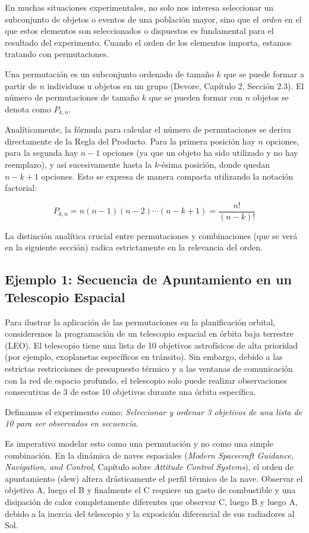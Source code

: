 En muchas situaciones experimentales, no solo nos interesa seleccionar un subconjunto de objetos o eventos de una población mayor, sino que el \textit{orden} en el que estos elementos son seleccionados o dispuestos es fundamental para el resultado del experimento. Cuando el orden de los elementos importa, estamos tratando con permutaciones. 

Una permutación es un subconjunto ordenado de tamaño $k$ que se puede formar a partir de $n$ individuos u objetos en un grupo (Devore, Capítulo 2, Sección 2.3). El número de permutaciones de tamaño $k$ que se pueden formar con $n$ objetos se denota como $P_{k,n}$. 

Analíticamente, la fórmula para calcular el número de permutaciones se deriva directamente de la Regla del Producto. Para la primera posición hay $n$ opciones, para la segunda hay $n-1$ opciones (ya que un objeto ha sido utilizado y no hay reemplazo), y así sucesivamente hasta la $k$-ésima posición, donde quedan $n-k+1$ opciones. Esto se expresa de manera compacta utilizando la notación factorial:

$$ P_{k,n} = n(n-1)(n-2)\cdots(n-k+1) = \frac{n!}{(n-k)!} $$

La distinción analítica crucial entre permutaciones y combinaciones (que se verá en la siguiente sección) radica estrictamente en la relevancia del orden.

\subsection{Ejemplo 1: Secuencia de Apuntamiento en un Telescopio Espacial}

Para ilustrar la aplicación de las permutaciones en la planificación orbital, consideremos la programación de un telescopio espacial en órbita baja terrestre (LEO). El telescopio tiene una lista de 10 objetivos astrofísicos de alta prioridad (por ejemplo, exoplanetas específicos en tránsito). Sin embargo, debido a las estrictas restricciones de presupuesto térmico y a las ventanas de comunicación con la red de espacio profundo, el telescopio solo puede realizar observaciones consecutivas de 3 de estos 10 objetivos durante una órbita específica.

Definamos el experimento como: \textit{Seleccionar y ordenar 3 objetivos de una lista de 10 para ser observados en secuencia}. 

Es imperativo modelar esto como una permutación y no como una simple combinación. En la dinámica de naves espaciales (\textit{Modern Spacecraft Guidance, Navigation, and Control}, Capítulo sobre \textit{Attitude Control Systems}), el orden de apuntamiento (slew) altera drásticamente el perfil térmico de la nave. Observar el objetivo A, luego el B y finalmente el C requiere un gasto de combustible y una disipación de calor completamente diferentes que observar C, luego B y luego A, debido a la inercia del telescopio y la exposición diferencial de sus radiadores al Sol.


